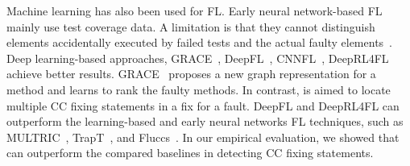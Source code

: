 Machine learning has also been used for FL.  Early neural
network-based FL~\cite{zheng2016fault, briand2007using, zhang2017deep,
  wong2009bp} mainly use test coverage data. A limitation is that they
cannot distinguish elements accidentally executed by failed tests and
the actual faulty elements~\cite{TraPT}.
%
Deep learning-based approaches, GRACE~\cite{lou2021boosting},
DeepFL~\cite{DeepFL}, CNNFL~\cite{zhang2019cnn},
DeepRL4FL~\cite{icse21-fl} achieve better
results. GRACE~\cite{lou2021boosting} proposes a new graph
representation for a method and learns to rank the faulty methods.  In
contrast, {\tool} is aimed to locate multiple CC fixing
statements in a fix for a fault. DeepFL and DeepRL4FL can outperform the
learning-based and early neural networks FL techniques, such as
MULTRIC~\cite{MULTRIC}, TrapT~\cite{TraPT}, and
Fluccs~\cite{sohn2017fluccs}. In our empirical evaluation, we 
showed that {\tool} can outperform the compared baselines in detecting
CC fixing statements.














\iffalse

